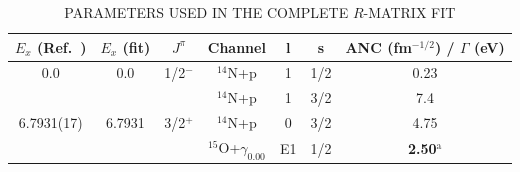 \begin{table}[]
\caption{PARAMETERS USED IN THE COMPLETE $R$-MATRIX FIT}
\begin{center}
\begin{threeparttable}
\begin{tabular}{c  c  c  c  c  c  c}
\toprule
$E_x$ (Ref.~\cite{Ajzenberg-Selove1991}) &   $E_x$ (fit) & $J^\pi$ & Channel & l & s & ANC (fm$^{-1/2}$) / $\Gamma$ (eV)\\ 
\midrule
0.0 & 0.0	& 1/2$^-$ &	$^{14}$N+p &	1&	1/2&	{0.23}\\
	&	&	    &    $^{14}$N+p &	1&	3/2&	{7.4} \\
6.7931(17) & {6.7931}&	3/2$^+$ & $^{14}$N+p &	0&	3/2&	{4.75}\\
	&	&	     &  $^{15}$O+$\gamma_{0.00}$	&  E1  &	1/2&	\textbf{2.50$^{\text{a}}$}\\
\hline

\end{tabular}
\end{threeparttable}
\end{center}
\end{table}
